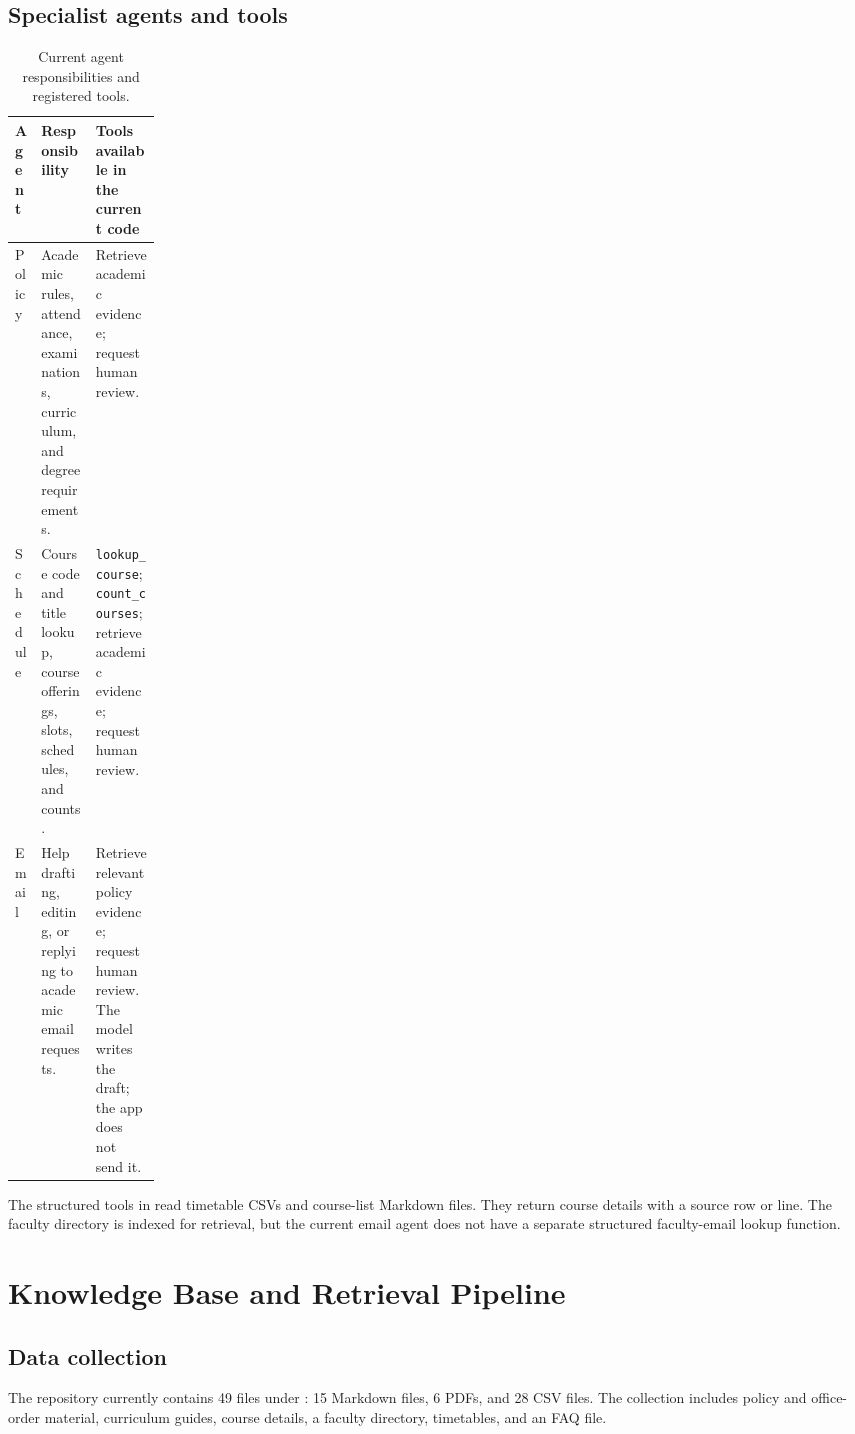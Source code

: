 \documentclass[11pt,a4paper]{article}
\begin{document}
\subsection{Specialist agents and tools}
\begin{table}[htbp]
\centering
\small
\begin{tabularx}{\linewidth}{@{}L{0.17\linewidth}YY@{}}
\toprule
\textbf{Agent} & \textbf{Responsibility} & \textbf{Tools available in the current code}\\
\midrule
Policy & Academic rules, attendance, examinations, curriculum, and degree requirements. & Retrieve academic evidence; request human review.\\
Schedule & Course code and title lookup, course offerings, slots, schedules, and counts. & \texttt{lookup\_course}; \texttt{count\_courses}; retrieve academic evidence; request human review.\\
Email & Help drafting, editing, or replying to academic email requests. & Retrieve relevant policy evidence; request human review. The model writes the draft; the app does not send it.\\
\bottomrule
\end{tabularx}
\caption{Current agent responsibilities and registered tools.}
\label{tab:agents}
\end{table}

The structured tools in  read timetable CSVs and course-list Markdown files. They return course details with a source row or line. The faculty directory is indexed for retrieval, but the current email agent does not have a separate structured faculty-email lookup function.

\section{Knowledge Base and Retrieval Pipeline}
\subsection{Data collection}
The repository currently contains 49 files under : 15 Markdown files, 6 PDFs, and 28 CSV files. The collection includes policy and office-order material, curriculum guides, course details, a faculty directory, timetables, and an FAQ file.
\end{document}
